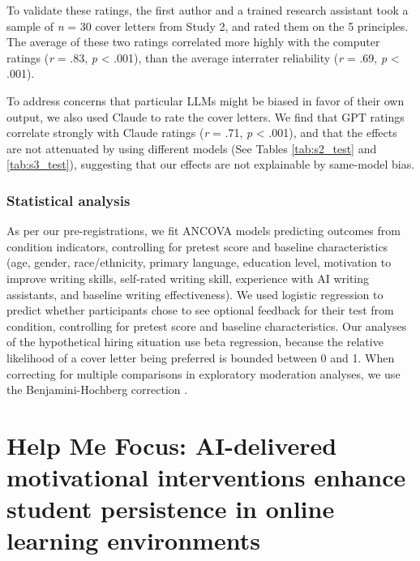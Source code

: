 \documentclass[11pt]{report}
\begin{document}
\begin{mainf}
To validate these ratings, the first author and a trained research assistant took a sample of \textit{n} = 30 cover letters from Study 2, and rated them on the 5 principles. The average of these two ratings correlated more highly with the computer ratings (\textit{r} = .83, \textit{p} < .001), than the average interrater reliability (\textit{r} = .69, \textit{p} < .001).

To address concerns that particular LLMs might be biased in favor of their own output, we also used Claude to rate the cover letters. We find that GPT ratings correlate strongly with Claude ratings (\textit{r} = .71, \textit{p} < .001), and that the effects are not attenuated by using different models (See Tables \ref{tab:s2_test} and \ref{tab:s3_test}), suggesting that our effects are not explainable by same-model bias.

\subsection*{Statistical analysis}
As per our pre-registrations, we fit ANCOVA models predicting outcomes from condition indicators, controlling for pretest score and baseline characteristics (age, gender, race/ethnicity, primary language, education level, motivation to improve writing skills, self-rated writing skill, experience with AI writing assistants, and baseline writing effectiveness). We used logistic regression to predict whether participants chose to see optional feedback for their test from condition, controlling for pretest score and baseline characteristics. 
Our analyses of the hypothetical hiring situation use beta regression, because the relative likelihood of a cover letter being preferred is bounded between 0 and 1.
When correcting for multiple comparisons in exploratory moderation analyses, we use the Benjamini-Hochberg correction \cite{benjamini1995controlling}. 

\chapter{Help Me Focus: AI-delivered motivational interventions enhance student persistence in online learning environments}


\end{mainf}
\end{document}
